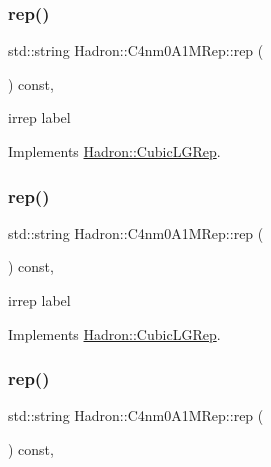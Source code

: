 \subsubsection{\texorpdfstring{rep()}{rep()}\hspace{0.1cm}{\footnotesize\ttfamily [1/3]}}
{\footnotesize\ttfamily std\+::string Hadron\+::\+C4nm0\+A1\+M\+Rep\+::rep (\begin{DoxyParamCaption}{ }\end{DoxyParamCaption}) const\hspace{0.3cm}{\ttfamily [inline]}, {\ttfamily [virtual]}}

irrep label 

Implements \mbox{\hyperlink{structHadron_1_1CubicLGRep_a50f5ddbb8f4be4cee0106fa9e8c75e6c}{Hadron\+::\+Cubic\+L\+G\+Rep}}.

\mbox{\label{structHadron_1_1C4nm0A1MRep_aca630b917cc8bdae915cc1ba072b9166}} 
\subsubsection{\texorpdfstring{rep()}{rep()}\hspace{0.1cm}{\footnotesize\ttfamily [2/3]}}
{\footnotesize\ttfamily std\+::string Hadron\+::\+C4nm0\+A1\+M\+Rep\+::rep (\begin{DoxyParamCaption}{ }\end{DoxyParamCaption}) const\hspace{0.3cm}{\ttfamily [inline]}, {\ttfamily [virtual]}}

irrep label 

Implements \mbox{\hyperlink{structHadron_1_1CubicLGRep_a50f5ddbb8f4be4cee0106fa9e8c75e6c}{Hadron\+::\+Cubic\+L\+G\+Rep}}.

\mbox{\label{structHadron_1_1C4nm0A1MRep_aca630b917cc8bdae915cc1ba072b9166}} 
\subsubsection{\texorpdfstring{rep()}{rep()}\hspace{0.1cm}{\footnotesize\ttfamily [3/3]}}
{\footnotesize\ttfamily std\+::string Hadron\+::\+C4nm0\+A1\+M\+Rep\+::rep (\begin{DoxyParamCaption}{ }\end{DoxyParamCaption}) const\hspace{0.3cm}{\ttfamily [inline]}, {\ttfamily [virtual]}}

